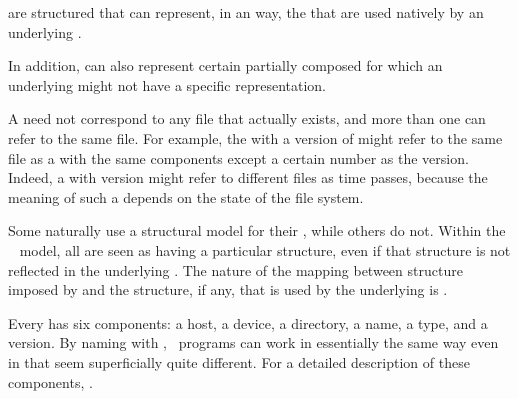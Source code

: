 %

 are structured  that can represent,
in an  way,
the  that are used natively by an underlying .

In addition,  can also represent certain partially composed 
 for which an underlying  
might not have a specific  representation.


A  need not correspond to any file that actually exists, 
and more than one  can refer to the same file.
For example, the  with a version of  
might refer to the same file as a  
with the same components except a certain number as the version.
Indeed, a  with version  might refer to
different files as time passes, because the meaning of such a 
depends on the state of the file system.  

Some  naturally use a structural model for their
, while others do not.  Within the \clisp\  model, 
all  are seen as having a particular structure,
even if that structure is not reflected in the underlying .
The nature of the mapping between structure imposed by 
and the structure, if any, that is used by the underlying 
is .


Every  has six components:
     a host,
     a device,
     a directory,
     a name,
     a type,
 and a version.
By naming  with , 
\clisp\ programs can work in essentially the same way even in 
that seem superficially quite different.
For a detailed description of these components, \seesection\PathnameComponents.

